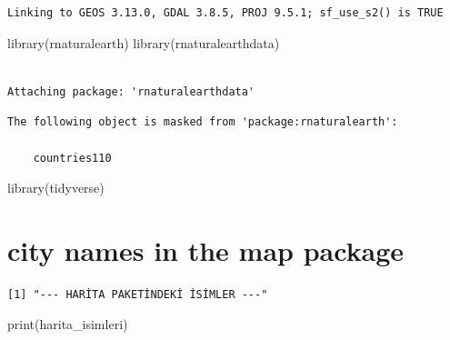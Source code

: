 \documentclass[
  11pt,
  a4paper,
  DIV=11,
  numbers=noendperiod]{scrartcl}
\newenvironment{Shaded}{\begin{snugshade}}{\end{snugshade}}
\newcommand{\AttributeTok}[1]{\textcolor[rgb]{0.40,0.45,0.13}{#1}}
\newcommand{\FunctionTok}[1]{\textcolor[rgb]{0.28,0.35,0.67}{#1}}
\newcommand{\NormalTok}[1]{\textcolor[rgb]{0.00,0.23,0.31}{#1}}
\newcommand{\OtherTok}[1]{\textcolor[rgb]{0.00,0.23,0.31}{#1}}
\newcommand{\SpecialCharTok}[1]{\textcolor[rgb]{0.37,0.37,0.37}{#1}}
\newcommand{\StringTok}[1]{\textcolor[rgb]{0.13,0.47,0.30}{#1}}
\begin{document}
\begin{verbatim}
Linking to GEOS 3.13.0, GDAL 3.8.5, PROJ 9.5.1; sf_use_s2() is TRUE
\end{verbatim}

\begin{Shaded}
\begin{Highlighting}[]
\FunctionTok{library}\NormalTok{(rnaturalearth)}
\FunctionTok{library}\NormalTok{(rnaturalearthdata)}
\end{Highlighting}
\end{Shaded}

\begin{verbatim}

Attaching package: 'rnaturalearthdata'
\end{verbatim}

\begin{verbatim}
The following object is masked from 'package:rnaturalearth':

    countries110
\end{verbatim}

\begin{Shaded}
\begin{Highlighting}[]
\FunctionTok{library}\NormalTok{(tidyverse)}
\end{Highlighting}
\end{Shaded}

\section{city names in the map
package}\label{city-names-in-the-map-package}

\begin{Shaded}
\end{Shaded}

\begin{verbatim}
[1] "--- HARİTA PAKETİNDEKİ İSİMLER ---"
\end{verbatim}

\begin{Shaded}
\begin{Highlighting}[]
\FunctionTok{print}\NormalTok{(harita\_isimleri)}
\end{Highlighting}
\end{Shaded}
\end{document}

